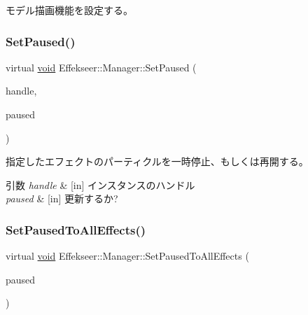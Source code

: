 モデル描画機能を設定する。 

\mbox{\label{class_effekseer_1_1_manager_a6414ea849302b7cef51b61a38c7ecd76}} 
\subsubsection{\texorpdfstring{Set\+Paused()}{SetPaused()}}
{\footnotesize\ttfamily virtual \mbox{\hyperlink{namespace_effekseer_ab34c4088e512200cf4c2716f168deb56}{void}} Effekseer\+::\+Manager\+::\+Set\+Paused (\begin{DoxyParamCaption}\item[{\mbox{\hyperlink{namespace_effekseer_afba58b8d812da862190e9bbfc040824a}{Handle}}}]{handle,  }\item[{bool}]{paused }\end{DoxyParamCaption})\hspace{0.3cm}{\ttfamily [pure virtual]}}



指定したエフェクトのパーティクルを一時停止、もしくは再開する。 


\begin{DoxyParams}{引数}
{\em handle} & \mbox{[}in\mbox{]} インスタンスのハンドル \\
\hline
{\em paused} & \mbox{[}in\mbox{]} 更新するか? \\
\hline
\end{DoxyParams}
\mbox{\label{class_effekseer_1_1_manager_a08c4c39a56fcc93b8acb284ff9bc933b}} 
\subsubsection{\texorpdfstring{Set\+Paused\+To\+All\+Effects()}{SetPausedToAllEffects()}}
{\footnotesize\ttfamily virtual \mbox{\hyperlink{namespace_effekseer_ab34c4088e512200cf4c2716f168deb56}{void}} Effekseer\+::\+Manager\+::\+Set\+Paused\+To\+All\+Effects (\begin{DoxyParamCaption}\item[{bool}]{paused }\end{DoxyParamCaption})\hspace{0.3cm}{\ttfamily [pure virtual]}}



